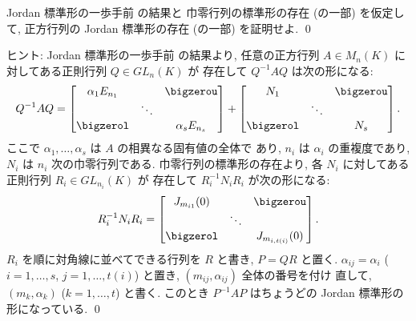\documentclass[12pt,twoside]{jarticle}
\begin{document}
\begin{question}
\label{q:existence-Jordan}
  Jordan 標準形の一歩手前  の結果と
  巾零行列の標準形の存在 (の一部) 
  を仮定して, 正方行列の Jordan 標準形の存在 
  (の一部) を証明せよ. 
  \qed
\end{question}

\noindent
ヒント: Jordan 標準形の一歩手前  の結果より, 
任意の正方行列 $A\in M_n(K)$ に対してある正則行列 $Q\in GL_n(K)$ が
存在して $Q^{-1}AQ$ は次の形になる:
\begin{equation*}
  Q^{-1}AQ = 
  \begin{bmatrix}
    \alpha_1 E_{n_1} &        & \bigzerou \\
                     & \ddots & \\
    \bigzerol        &        & \alpha_s E_{n_s} \\
  \end{bmatrix}
  +
  \begin{bmatrix}
    N_1       &        & \bigzerou \\
              & \ddots & \\
    \bigzerol &        & N_s \\
  \end{bmatrix}.
\end{equation*}
ここで $\alpha_1,\dots,\alpha_s$ は $A$ の相異なる固有値の全体で
あり, $n_i$ は $\alpha_i$ の重複度であり, $N_i$ は $n_i$ 次の巾零行列である.
巾零行列の標準形の存在より, 
各 $N_i$ に対してある正則行列 $R_i\in GL_{n_i}(K)$ が
存在して $R_i^{-1}N_iR_i$ が次の形になる:
\begin{equation*}
  R_i^{-1}N_iR_i =
  \begin{bmatrix}
    J_{m_{i1}}(0) &        & \bigzerou \\
                  & \ddots & \\
    \bigzerol     &        & J_{m_{i,t(i)}}(0) \\
  \end{bmatrix}.
\end{equation*}
$R_i$ を順に対角線に並べてできる行列を $R$ と書き, $P=QR$ と置く.
$\alpha_{ij}=\alpha_i$ ($i=1,\dots,s$, $j=1,\dots,t(i)$) と置き,
$(m_{ij}, \alpha_{ij})$ 全体の番号を付け
直して, $(m_k, \alpha_k)$ ($k=1,\dots,t$) と書く.
このとき $P^{-1}AP$ はちょうどの
Jordan 標準形の形になっている.
\qed

\bigskip
\end{document}
